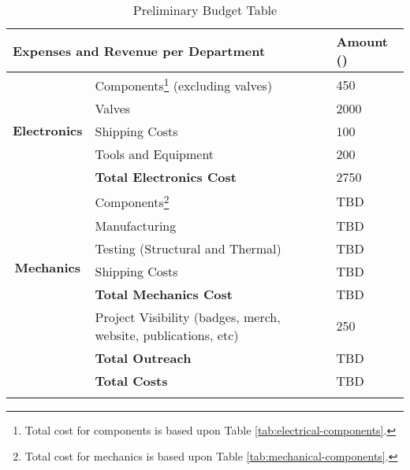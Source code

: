 \begin{longtable}[]
{|c|l|l|}
\hline
\multicolumn{2}{|l|}{\textbf{Expenses and Revenue per Department}} & Amount (\EUR{}) \\ \hline
\multicolumn{1}{|c|}{\multirow{5}{*}{\textbf{Electronics}}} & Components\footnote{Total cost for components is based upon Table \ref{tab:electrical-components}.} (excluding valves) & 450 \\
\multicolumn{1}{|c|}{} & Valves & 2000 \\
\multicolumn{1}{|c|}{} & Shipping Costs & 100 \\
\multicolumn{1}{|c|}{} & Tools and Equipment & 200 \\ \cline{2-3} 
\multicolumn{1}{|c|}{} & \textbf{Total Electronics Cost} & 2750 \\ \hline
\multicolumn{1}{|c|}{\multirow{6}{*}{\textbf{Mechanics}}} & Components\footnote{Total cost for mechanics is based upon Table \ref{tab:mechanical-components}.} & TBD \\
\multicolumn{1}{|c|}{} & Manufacturing & TBD \\
\multicolumn{1}{|c|}{} & Testing (Structural and Thermal) & TBD \\
\multicolumn{1}{|c|}{} & Shipping Costs & TBD \\
\cline{2-3} 
\multicolumn{1}{|c|}{} & \textbf{Total Mechanics Cost} & TBD \\ \hline
\multicolumn{1}{|c|}{} & Project Visibility (badges, merch, website, publications, etc) & 250\\
\cline{2-3} 
\multicolumn{1}{|c|}{} & \textbf{Total Outreach} & TBD \\ \hline
\multicolumn{1}{l|}{} & \textbf{Total Costs} & TBD \\ \cline{2-3} 
\caption{Preliminary Budget Table}
\label{tab:budget-table}
\end{longtable}
\raggedbottom